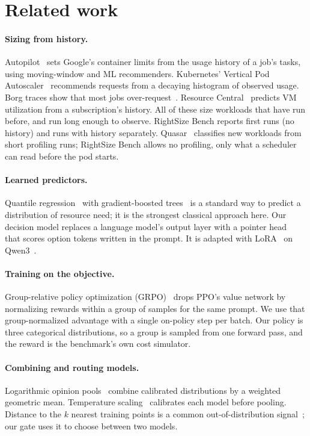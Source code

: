 \section{Related work}
\label{sec:related}

\paragraph{Sizing from history.}
Autopilot~\citep{rzadca2020autopilot} sets Google's container limits from the usage
history of a job's tasks, using moving-window and ML recommenders. Kubernetes' Vertical
Pod Autoscaler~\citep{k8svpa} recommends requests from a decaying histogram of observed
usage. Borg traces show that most jobs over-request~\citep{verma2015borg,tirmazi2020borg}.
Resource Central~\citep{cortez2017resourcecentral} predicts VM utilization from a
subscription's history. All of these size workloads that have run before, and run long
enough to observe. RightSize Bench reports first runs (no history) and runs with history
separately. Quasar~\citep{delimitrou2014quasar} classifies new workloads from short
profiling runs; RightSize Bench allows no profiling, only what a scheduler can read
before the pod starts.

\paragraph{Learned predictors.}
Quantile regression~\citep{koenker1978quantile} with gradient-boosted
trees~\citep{friedman2001gbm,ke2017lightgbm} is a standard way to predict a distribution
of resource need; it is the strongest classical approach here. Our decision model
replaces a language model's output layer with a pointer head~\citep{vinyals2015pointer}
that scores option tokens written in the prompt. It is adapted with LoRA~\citep{hu2022lora}
on Qwen3~\citep{qwen3}.

\paragraph{Training on the objective.}
Group-relative policy optimization (GRPO)~\citep{shao2024deepseekmath} drops PPO's value
network by normalizing rewards within a group of samples for the same prompt. We use that
group-normalized advantage with a single on-policy step per batch. Our policy is three
categorical distributions, so a group is sampled from one forward pass, and the reward is the
benchmark's own cost simulator.

\paragraph{Combining and routing models.}
Logarithmic opinion pools~\citep{genest1986pools} combine calibrated distributions by a
weighted geometric mean. Temperature scaling~\citep{guo2017calibration} calibrates each
model before pooling. Distance to the $k$ nearest training points is a common
out-of-distribution signal~\citep{sun2022knnood}; our gate uses it to choose between two
models.
